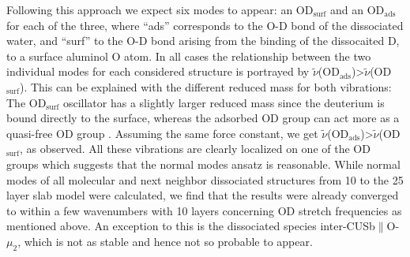 \documentclass[11pt,DIV=13,BCOR=5mm,a4paper,headinclude]{scrbook}
\begin{document}
 Following this approach we expect six modes to appear: an OD$_\textrm{surf}$ and an OD$_\textrm{ads}$ for each of the three, where ``ads'' corresponds to the O-D bond of the dissociated water, and ``surf'' to the O-D bond arising from the binding of the dissocaited D, to a surface aluminol O atom.
In all cases the relationship between the two individual modes for each considered structure is portrayed by $\tilde{\nu}$(OD$_\textrm{ads}$)>$\tilde{\nu}$(OD$_\textrm{surf}$).
This can be explained with the different reduced mass for both vibrations: The OD$_\textrm{surf}$ oscillator has a slightly larger reduced mass since the deuterium is bound directly to the surface, whereas the adsorbed OD group can act more as a quasi-free OD group \cite{Wirth2014}.
Assuming the same force constant, we get $\tilde{\nu}$(OD$_\textrm{ads}$)>$\tilde{\nu}$(OD$_\textrm{surf}$, as observed.
All these vibrations are clearly localized on one of the OD groups which suggests that the normal modes ansatz is reasonable.
While normal modes of all molecular and next neighbor dissociated structures from 10 to the 25 layer slab model were calculated, we find that the results were already converged to within a few wavenumbers with 10 layers concerning OD stretch frequencies as mentioned above. %
An exception to this is the dissociated species inter-CUSb$\parallel$O-$\mu_2$, which is not as stable and hence not so probable to appear.
\\
\\
\end{document}
